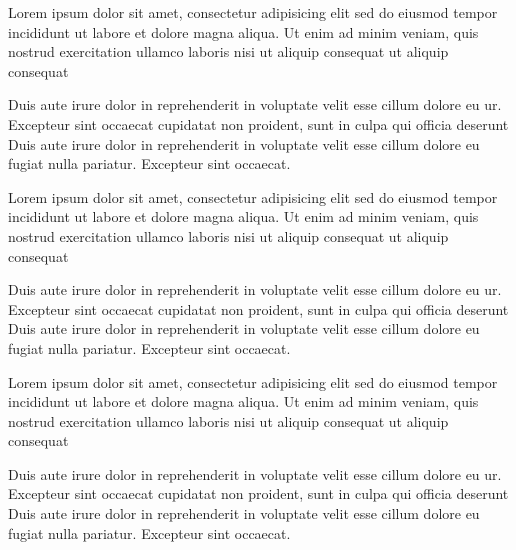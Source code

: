 \documentclass{article}
\begin{document}
\begin{pages}
\begin{Leftside}
Lorem ipsum dolor sit amet, consectetur adipisicing elit
sed do eiusmod tempor incididunt ut labore et dolore
magna aliqua. Ut enim ad minim veniam, quis nostrud
exercitation ullamco laboris nisi
ut aliquip consequat ut aliquip consequat
\pend

Duis aute irure dolor in reprehenderit
in voluptate velit esse cillum dolore eu ur. Excepteur sint occaecat
cupidatat non proident, sunt in culpa qui officia deserunt
Duis aute irure dolor in reprehenderit
in voluptate velit esse cillum dolore eu fugiat nulla
pariatur. Excepteur sint occaecat.
\pend

Lorem ipsum dolor sit amet, consectetur adipisicing elit
sed do eiusmod tempor incididunt ut labore et dolore
magna aliqua. Ut enim ad minim veniam, quis nostrud
exercitation ullamco laboris nisi
ut aliquip consequat ut aliquip consequat\pend

Duis aute  irure dolor in reprehenderit
in voluptate velit esse cillum dolore eu ur. Excepteur sint occaecat
cupidatat non proident, sunt in culpa qui officia deserunt
Duis aute irure dolor in reprehenderit
in voluptate velit esse cillum dolore eu fugiat nulla
pariatur. Excepteur sint occaecat.
\pend

Lorem ipsum dolor sit amet, consectetur adipisicing elit
sed do eiusmod tempor incididunt ut labore et dolore
magna aliqua. Ut enim ad minim veniam, quis nostrud
exercitation ullamco laboris nisi
ut aliquip consequat ut aliquip consequat
\pend

Duis aute irure dolor in reprehenderit
in voluptate velit esse cillum dolore eu ur. Excepteur sint occaecat
cupidatat non proident, sunt in culpa qui officia deserunt
Duis aute irure dolor in reprehenderit
in voluptate velit esse cillum dolore eu fugiat nulla
pariatur. Excepteur sint occaecat.
\pend


\end{Leftside}
\end{pages}
\end{document}
